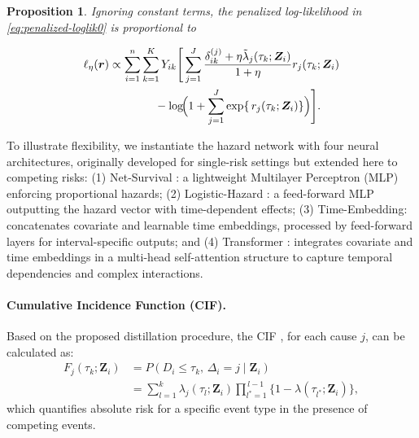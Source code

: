 \documentclass{article}
\theoremstyle{plain}
\newtheorem{proposition}[theorem]{Proposition}
\theoremstyle{definition}
\theoremstyle{remark}
\begin{document}
\begin{proposition}
    \label{prop2}
    Ignoring constant terms, the penalized log-likelihood in \eqref{eq:penalized-loglik0} is proportional to 
    
    \begin{align}
    \ell_{\eta}(\boldsymbol r)
    &\propto \sum_{i=1}^n \sum_{k=1}^K Y_{ik}
    \Bigg[
    \sum_{j=1}^J
    \frac{\delta_{ik}^{(j)} + \eta \tilde{\lambda}_j(\tau_k;\bm Z_i)}{1+\eta}
    r_j(\tau_k;\bm Z_i)
    \nonumber\\
    &\qquad\qquad
    - \log\!\Bigl( 1 + \sum_{j=1}^J \exp\{\,r_j(\tau_k;\bm Z_i)\} \Bigr)
    \Bigg].
    \label{log l kl competing}  
    \end{align}
\end{proposition}
To illustrate flexibility, we instantiate the hazard network with four neural architectures, originally developed for single-risk settings but extended here to competing risks: 
(1) Net-Survival \citep{gensheimer2019scalable}: a lightweight Multilayer Perceptron (MLP) enforcing proportional hazards;
(2) Logistic-Hazard \citep{kvamme2021continuous}: a feed-forward MLP outputting the hazard vector with time-dependent effects;
(3) Time-Embedding: concatenates covariate and learnable time embeddings, processed by feed-forward layers for interval-specific outputs; and
(4) Transformer \citep{hu2021transformer}: integrates covariate and time embeddings in a multi-head self-attention structure to capture temporal dependencies and complex interactions.

\paragraph{Cumulative Incidence Function (CIF).}  Based on the proposed distillation procedure, the CIF \citep{gray1988class}, for each cause $j$, can be calculated as:
\begin{align}
    F_j(\tau_k; \bm Z_i)
    &=
    P\!\left(D_i \le \tau_k,\, \Delta_i=j \mid \bm Z_i\right)
    \nonumber\\
    &=
    \sum_{l=1}^k
    \lambda_j(\tau_l;\bm Z_i)
    \prod_{l^*=1}^{\,l-1}
    \bigl\{1-\lambda(\tau_{l^*};\bm Z_i)\bigr\},
    \label{eq: CIF}
\end{align}
which quantifies absolute risk for a specific event type in the presence of competing events.
\end{document}
